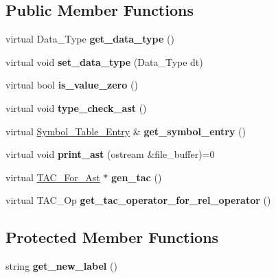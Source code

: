 \subsection*{Public Member Functions}
\begin{DoxyCompactItemize}
\item 
\mbox{\label{classAst_a59e90c47de802634360a46095bdfb9ac}} 
virtual Data\+\_\+\+Type {\bfseries get\+\_\+data\+\_\+type} ()
\item 
\mbox{\label{classAst_a5a8064877aa16ce098ddc75f93f55c1f}} 
virtual void {\bfseries set\+\_\+data\+\_\+type} (Data\+\_\+\+Type dt)
\item 
\mbox{\label{classAst_a7c5270909ce443f527f76d5911ebdf92}} 
virtual bool {\bfseries is\+\_\+value\+\_\+zero} ()
\item 
\mbox{\label{classAst_ae30169be4e52e013a5e6681cff1da803}} 
virtual void {\bfseries type\+\_\+check\+\_\+ast} ()
\item 
\mbox{\label{classAst_acfee244438a83610c1ad31772b6e0386}} 
virtual \hyperlink{classSymbol__Table__Entry}{Symbol\+\_\+\+Table\+\_\+\+Entry} \& {\bfseries get\+\_\+symbol\+\_\+entry} ()
\item 
\mbox{\label{classAst_a98a074f3b5a6b264644b971c453ca07d}} 
virtual void {\bfseries print\+\_\+ast} (ostream \&file\+\_\+buffer)=0
\item 
\mbox{\label{classAst_a0f9ef33a1229580bc9b92cd831681981}} 
virtual \hyperlink{classTAC__For__Ast}{T\+A\+C\+\_\+\+For\+\_\+\+Ast} $\ast$ {\bfseries gen\+\_\+tac} ()
\item 
\mbox{\label{classAst_a4d6bf010ebb08c96bf163ecb13a05bca}} 
virtual T\+A\+C\+\_\+\+Op {\bfseries get\+\_\+tac\+\_\+operator\+\_\+for\+\_\+rel\+\_\+operator} ()
\end{DoxyCompactItemize}
\subsection*{Protected Member Functions}
\begin{DoxyCompactItemize}
\item 
\mbox{\label{classAst_a202c29a1c1dca716a61bc969bb1a9733}} 
string {\bfseries get\+\_\+new\+\_\+label} ()
\end{DoxyCompactItemize}
